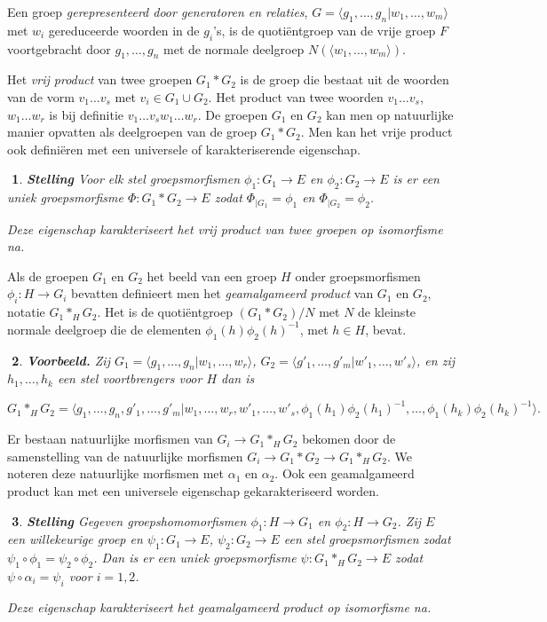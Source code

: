 \documentclass[12pt]{book}
\newtheorem{stelh}{$\!\!$}[section]
\newenvironment{stel}{\begin{stelh}{\em {\bf Stelling }}}{\end{stelh}}
\newtheorem{vbh}[stelh]{$\!\!$}
\newenvironment{vb}{\begin{vbh} \em {\bf Voorbeeld.} }{\end{vbh}}
\begin{document}
Een groep {\em gerepresenteerd door generatoren  en relaties}, $G=\langle g_1, \ldots , g_n| w_1, \ldots,
w_m\rangle$ met $w_i$ gereduceerde woorden in de $g_{i}$'s, is de quoti\"entgroep van
de vrije groep $F$ voortgebracht door $g_1,\ldots ,g_n$ met de normale deelgroep
$N(\langle w_1,\ldots, w_m\rangle)$.

Het {\em vrij product} van twee groepen $G_1\ast G_2$ is de groep die bestaat uit de woorden
van de vorm $v_1\ldots v_s$ met $v_i\in G_1\cup G_2$. Het product van twee woorden $v_1\ldots v_s$, $w_1\ldots
w_r$ is bij definitie $v_1\ldots v_sw_1\ldots w_r$. De groepen $G_1$ en $G_2$ kan men op natuurlijke manier
opvatten als deelgroepen van de groep $G_1\ast G_2$. Men kan het vrije product ook defini\"eren met
een universele of karakteriserende eigenschap.

\begin{stel} Voor elk stel groepsmorfismen $\phi_{1}:
G_1\to E$ en $\phi_{2}:G_2\to E$ is er een uniek groepsmorfisme $\Phi: G_1\ast G_2 \to E$ zodat
$\Phi_{|G_1}=\phi_1$ en $\Phi_{|G_2}=\phi_2$.

Deze eigenschap karakteriseert het vrij product van twee groepen op isomorfisme na.
\end{stel}

Als de groepen $G_1$ en $G_2$ het beeld van een groep $H$ onder groepsmorfismen $\phi_i:H\to
G_i$ bevatten definieert men het  {\em geamalgameerd product} van $G_1$ en $G_2$, notatie
$G_1\ast_{H}G_2$. Het is de quoti\"entgroep $(G_1\ast G_2)/N$ met $N$ de kleinste normale deelgroep
die de elementen $\phi_1(h)\phi_{2}(h)^{-1}$, met $h\in H$, bevat. 


\begin{vb} Zij $G_1=\langle g_1, \ldots, g_n|w_1, \ldots ,w_r\rangle$,
$G_2=\langle g'_1, \ldots, g'_m|w'_1, \ldots ,w'_s\rangle$, en zij $h_1, \ldots , h_k$ een stel
voortbrengers voor $H$ dan is

$$G_1\ast_{H} G_2=\langle g_1, \ldots, g_n, g'_1, \ldots, g'_m|w_1, \ldots ,w_r,w'_1, \ldots,w'_s,\phi_1(h_1)\phi_2(h_{1})^{-1}, \ldots, \phi_1(h_k)\phi_{2}(h_{k})^{-1}\rangle.$$
\end{vb}

Er bestaan natuurlijke morfismen van $G_i\to G_1\ast_HG_2$ bekomen door de samenstelling van de
natuurlijke morfismen $G_i\to G_1\ast G_2 \to G_1\ast_H G_2$. We noteren deze natuurlijke morfismen
met $\alpha_1$ en $\alpha_2$.
Ook een geamalgameerd product kan met een universele eigenschap gekarakteriseerd worden.
\begin{stel}
Gegeven groepshomomorfismen $\phi_1:H\to G_1$ en $\phi_2:H\to G_2$.
Zij $E$ een willekeurige groep en $\psi_{1}:G_1\to E$, $\psi_{2}:G_2\to E$ een stel groepsmorfismen
zodat $\psi_1\circ \phi_1=\psi_2\circ \phi_2$. Dan is er een uniek groepsmorfisme $\psi:G_1\ast_H G_2\to E$
zodat $\psi \circ \alpha_{i}=\psi_{i}$ voor $i=1,2$.

Deze eigenschap karakteriseert het geamalgameerd product op isomorfisme na.
\end{stel}
\end{document}
